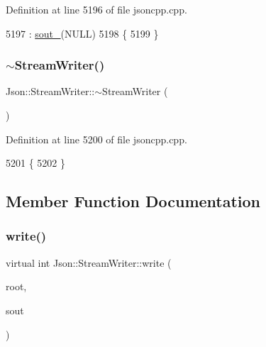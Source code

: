 Definition at line 5196 of file jsoncpp.\+cpp.


\begin{DoxyCode}
5197     : \hyperlink{class_json_1_1_stream_writer_a4f5603d4228a9fa46a42cb44e5234d9b}{sout\_}(NULL)
5198 \{
5199 \}
\end{DoxyCode}
\mbox{\label{class_json_1_1_stream_writer_a03f8fb6a873b6b50f05bc4556e043c3a}} 
\subsubsection{\texorpdfstring{$\sim$\+Stream\+Writer()}{~StreamWriter()}}
{\footnotesize\ttfamily Json\+::\+Stream\+Writer\+::$\sim$\+Stream\+Writer (\begin{DoxyParamCaption}{ }\end{DoxyParamCaption})\hspace{0.3cm}{\ttfamily [virtual]}}



Definition at line 5200 of file jsoncpp.\+cpp.


\begin{DoxyCode}
5201 \{
5202 \}
\end{DoxyCode}


\subsection{Member Function Documentation}
\mbox{\label{class_json_1_1_stream_writer_a84278bad0c9a9fc587bc2a97c5bb5993}} 
\subsubsection{\texorpdfstring{write()}{write()}}
{\footnotesize\ttfamily virtual int Json\+::\+Stream\+Writer\+::write (\begin{DoxyParamCaption}\item[{\hyperlink{class_json_1_1_value}{Value} const \&}]{root,  }\item[{\hyperlink{json_8h_a37a25be5fca174927780caeb280094ce}{J\+S\+O\+N\+C\+P\+P\+\_\+\+O\+S\+T\+R\+E\+AM} $\ast$}]{sout }\end{DoxyParamCaption})\hspace{0.3cm}{\ttfamily [pure virtual]}}

